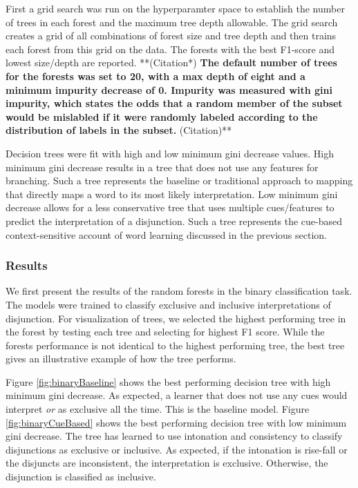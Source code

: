 \documentclass[floatsintext,man]{apa6}
\theoremstyle{definition}
\theoremstyle{definition}
\theoremstyle{definition}
\theoremstyle{remark}
\begin{document}
First a grid search was run on the hyperparamter space to establish the
number of trees in each forest and the maximum tree depth allowable. The
grid search creates a grid of all combinations of forest size and tree
depth and then trains each forest from this grid on the data. The
forests with the best F1-score and lowest size/depth are reported.
**(Citation*)\textbf{ The default number of trees for the forests was
set to 20, with a max depth of eight and a minimum impurity decrease of
0. Impurity was measured with gini impurity, which states the odds that
a random member of the subset would be mislabled if it were randomly
labeled according to the distribution of labels in the subset.
}(Citation)**

Decision trees were fit with high and low minimum gini decrease values.
High minimum gini decrease results in a tree that does not use any
features for branching. Such a tree represents the baseline or
traditional approach to mapping that directly maps a word to its most
likely interpretation. Low minimum gini decrease allows for a less
conservative tree that uses multiple cues/features to predict the
interpretation of a disjunction. Such a tree represents the cue-based
context-sensitive account of word learning discussed in the previous
section.

\subsubsection{Results}\label{results-1}

We first present the results of the random forests in the binary
classification task. The models were trained to classify exclusive and
inclusive interpretations of disjunction. For visualization of trees, we
selected the highest performing tree in the forest by testing each tree
and selecting for highest F1 score. While the forests performance is not
identical to the highest performing tree, the best tree gives an
illustrative example of how the tree performs.

Figure \ref{fig:binaryBaseline} shows the best performing decision tree
with high minimum gini decrease. As expected, a learner that does not
use any cues would interpret \emph{or} as exclusive all the time. This
is the baseline model. Figure \ref{fig:binaryCueBased} shows the best
performing decision tree with low minimum gini decrease. The tree has
learned to use intonation and consistency to classify disjunctions as
exclusive or inclusive. As expected, if the intonation is rise-fall or
the disjuncts are inconsistent, the interpretation is exclusive.
Otherwise, the disjunction is classified as inclusive.
\end{document}
